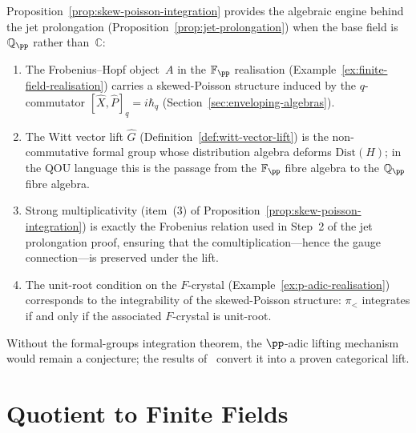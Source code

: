 \begin{remark}
\label{rem:witt-lift-qou}
Proposition~\ref{prop:skew-poisson-integration} provides the algebraic
engine behind the jet prolongation
(Proposition~\ref{prop:jet-prolongation}) when the base field is
$\mathbb{Q}_\pp$ rather than~$\mathbb{C}$:
\begin{enumerate}
  \item The Frobenius--Hopf object~$A$ in the $\mathbb{F}_\pp$ realisation
        (Example~\ref{ex:finite-field-realisation}) carries a
        skewed-Poisson structure induced by the $q$-commutator
        $[\hat{X},\hat{P}]_q = i\hbar_q$
        (Section~\ref{sec:enveloping-algebras}).
  \item The Witt vector lift $\widehat{G}$
        (Definition~\ref{def:witt-vector-lift}) is the non-commutative
        formal group whose distribution algebra deforms
        $\mathrm{Dist}(H)$; in the QOU language this is the passage from
        the $\mathbb{F}_\pp$ fibre algebra to the $\mathbb{Q}_\pp$ fibre
        algebra.
  \item Strong multiplicativity (item~(3) of
        Proposition~\ref{prop:skew-poisson-integration}) is exactly the
        Frobenius relation used in Step~2 of the jet prolongation proof,
        ensuring that the comultiplication---hence the gauge connection---is
        preserved under the lift.
  \item The unit-root condition on the $F$-crystal
        (Example~\ref{ex:p-adic-realisation}) corresponds to the
        integrability of the skewed-Poisson structure: $\pi_<$ integrates
        if and only if the associated $F$-crystal is unit-root.
\end{enumerate}
Without the formal-groups integration theorem, the $\pp$-adic lifting
mechanism would remain a conjecture; the results
of~\cite{fred2005} convert it into a proven categorical lift.
\end{remark}


\section{Quotient to Finite Fields}
\label{sec:finite-fields}

